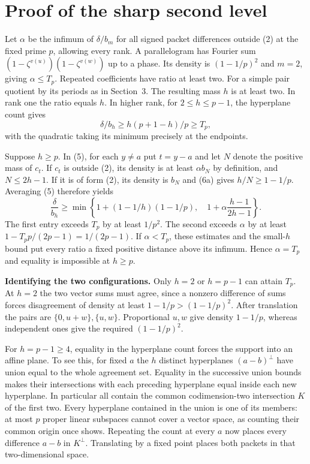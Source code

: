 \documentclass[11pt,letterpaper]{article}
\newcommand{\heading}[1]{\section*{\color{ink}#1}}
\newcommand{\subhead}[1]{\par\smallskip\noindent\textbf{#1.}\enspace}
\begin{document}
\newpage
\heading{Proof of the sharp second level}
Let $\alpha$ be the infimum of $\delta/b_m$ for all signed packet differences outside (2) at the fixed prime $p$, allowing every rank. A parallelogram has Fourier sum $(1-\zeta^{v(u)})(1-\zeta^{v(w)})$ up to a phase. Its density is $(1-1/p)^2$ and $m=2$, giving $\alpha\le T_p$. Repeated coefficients have ratio at least two. For a simple pair quotient by its periods as in Section~3. The resulting mass $h$ is at least two. In rank one the ratio equals $h$. In higher rank, for $2\le h\le p-1$, the hyperplane count gives
\[
        \delta/b_h\ge h(p+1-h)/p\ge T_p ,
\]
with the quadratic taking its minimum precisely at the endpoints.

Suppose $h\ge p$. In (5), for each $y\ne a$ put $t=y-a$ and let $N$ denote the positive mass of $c_t$. If $c_t$ is outside (2), its density is at least $\alpha b_N$ by definition, and $N\le2h-1$. If it is of form (2), its density is $b_N$ and (6a) gives $h/N\ge1-1/p$. Averaging (5) therefore yields
\[
 \frac{\delta}{b_h}\ge
 \min\!\left\{1+(1-1/h)(1-1/p),\quad 1+\alpha\frac{h-1}{2h-1}\right\}. \tag{9a}
\]
The first entry exceeds $T_p$ by at least $1/p^2$. The second exceeds $\alpha$ by at least $1-T_p p/(2p-1)=1/(2p-1)$. If $\alpha<T_p$, these estimates and the small-$h$ bound put every ratio a fixed positive distance above its infimum. Hence $\alpha=T_p$ and equality is impossible at $h\ge p$.

\subhead{Identifying the two configurations}
Only $h=2$ or $h=p-1$ can attain $T_p$. At $h=2$ the two vector sums must agree, since a nonzero difference of sums forces disagreement of density at least $1-1/p>(1-1/p)^2$. After translation the pairs are $\{0,u+w\},\{u,w\}$. Proportional $u,w$ give density $1-1/p$, whereas independent ones give the required $(1-1/p)^2$.

For $h=p-1\ge4$, equality in the hyperplane count forces the support into an affine plane. To see this, for fixed $a$ the $h$ distinct hyperplanes $(a-b)^\perp$ have union equal to the whole agreement set. Equality in the successive union bounds makes their intersections with each preceding hyperplane equal inside each new hyperplane. In particular all contain the common codimension-two intersection $K$ of the first two. Every hyperplane contained in the union is one of its members: at most $p$ proper linear subspaces cannot cover a vector space, as counting their common origin once shows. Repeating the count at every $a$ now places every difference $a-b$ in $K^\perp$. Translating by a fixed point places both packets in that two-dimensional space.
\end{document}
